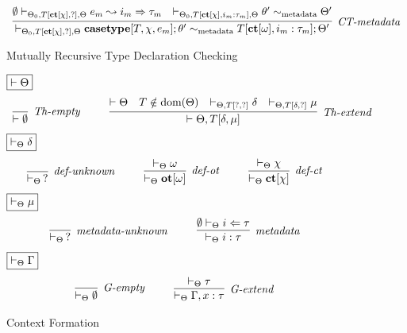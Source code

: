 \begin{figure}[t]
\[\begin{array}{c}
\infer[\textit{CT-metadata}]
  {\vdash_{\Theta_0, T[\keyw{ct}[\chi],?], \Theta} \keyw{casetype}[T, \chi, e_m]; \theta' \sim_{\text{metadata}} T[\keyw{ct}[\omega],i_m:\tau_m]; \Theta'}
  { \emptyset \vdash_{\Theta_0, T[\keyw{ct}[\chi], ?], \Theta} e_m \leadsto i_m \Rightarrow \tau_m
  & \vdash_{\Theta_0, T[\keyw{ct}[\chi], i_m : \tau_m], \Theta} \theta' \sim_{\text{metadata}} \Theta'}
\end{array}
\]
\caption{Mutually Recursive Type Declaration Checking}
\label{fig:mutual-recursion}
\end{figure}

\begin{figure}[h]
$\fbox{$\vdash \Theta$}$
\[
\begin{array}{c}
\infer[\textit{Th-empty}]
{\vdash \emptyset}
{ }
~~~~~~~~
\infer[\textit{Th-extend}]
{\vdash \Theta, T[\delta, \mu]}
{\vdash \Theta & T \notin \text{dom}(\Theta) & \vdash_{\Theta, T[?, ?]} \delta &
\vdash_{\Theta, T[\delta, ?]} \mu}
\end{array}
\]
$\fbox{$\vdash_\Theta \delta$}$
\[
\begin{array}{c}
\infer[\textit{def-unknown}]
{\vdash_\Theta\,?}
{ }
~~~~~~~~
\infer[\textit{def-ot}]
{\vdash_\Theta \keyw{ot}[\omega]}
{\vdash_\Theta \omega}
~~~~~~~~
\infer[\textit{def-ct}]
{\vdash_\Theta \keyw{ct}[\chi]}
{\vdash_\Theta \chi}
\end{array}
\]
$\fbox{$\vdash_\Theta \mu$}$
\[
\begin{array}{c}
\infer[\textit{metadata-unknown}]
{\vdash_\Theta\,?}
{ }
~~~~~~~~
\infer[\textit{metadata}]
{\vdash_\Theta i : \tau}
{\emptyset \vdash_\Theta i \Leftarrow \tau}
\end{array}
\]
$\fbox{$\vdash_\Theta \Gamma$}$
\[
\begin{array}{c}
\infer[\textit{G-empty}]
{\vdash_\Theta \emptyset}
{ }
~~~~~~~~
\infer[\textit{G-extend}]
{\vdash_\Theta \Gamma, x : \tau}
{\vdash_\Theta \tau}
\end{array}
\]
\caption{Context Formation}
\label{fig:context-formation}
\end{figure}
\newpage
